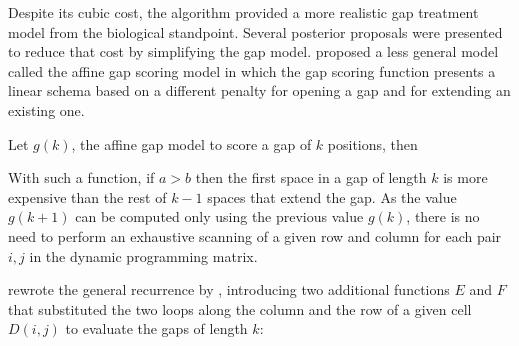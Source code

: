 \label{gotoh}

 
Despite its cubic cost, the  algorithm provided a more realistic gap 
treatment model from the biological standpoint. Several posterior proposals were presented to reduce
that cost by simplifying the gap model. \citet{gotoh:1982a} proposed a less general model called
the affine gap scoring model in which the gap scoring function presents a linear schema based on a 
different penalty for opening a gap and for extending an existing one.

Let $g(k)$, the affine gap model to score a gap of $k$ positions, then

\begin{center}
\end{center}

With such a function, if $a > b$ then the first space in a gap of length $k$ is more expensive than the
rest of $k-1$ spaces that extend the gap. As the value $g(k+1)$ can be computed only using the previous
value $g(k)$, there is no need to perform an exhaustive scanning of a given row and column for each pair
$i,j$ in the dynamic programming matrix.


\citeauthor{gotoh:1982a} rewrote the general recurrence by \citet{waterman:1976a}, introducing two 
additional functions $E$ and $F$ that substituted the two loops along the column and the row of a given
cell $D(i,j)$ to evaluate the gaps of length $k$:

